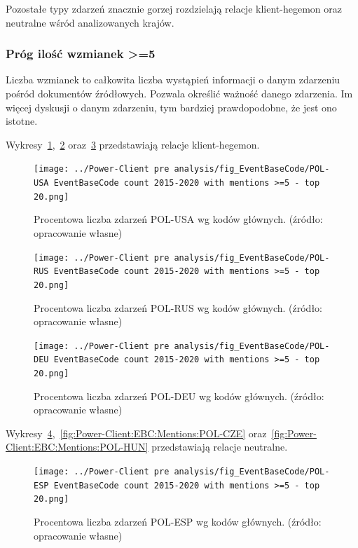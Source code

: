 \documentclass[11pt]{report}
\begin{document}
    Pozostałe typy zdarzeń znacznie gorzej rozdzielają relacje klient-hegemon oraz neutralne wśród analizowanych krajów.

    \subsubsection{Próg ilość wzmianek >=5}
    Liczba wzmianek to całkowita liczba wystąpień informacji o danym zdarzeniu pośród dokumentów źródłowych.
    Pozwala określić ważność danego zdarzenia.
    Im więcej dyskusji o danym zdarzeniu, tym bardziej prawdopodobne, że jest ono istotne.

    Wykresy~\ref{fig:Power-Client:EBC:Mentions:POL-USA},~\ref{fig:Power-Client:EBC:Mentions:POL-RUS} oraz~\ref{fig:Power-Client:EBC:Mentions:POL-DEU} przedstawiają relacje klient-hegemon.
    \begin{figure}[!htp]
        \centering
        \texttt{[image: ../Power-Client pre analysis/fig\_EventBaseCode/POL-USA EventBaseCode count 2015-2020 with mentions >=5 - top 20.png]}
        \caption{Procentowa liczba zdarzeń POL-USA wg kodów głównych. (źródło: opracowanie własne)}
        \label{fig:Power-Client:EBC:Mentions:POL-USA}
    \end{figure}

    \begin{figure}[!htp]
        \centering
        \texttt{[image: ../Power-Client pre analysis/fig\_EventBaseCode/POL-RUS EventBaseCode count 2015-2020 with mentions >=5 - top 20.png]}
        \caption{Procentowa liczba zdarzeń POL-RUS wg kodów głównych. (źródło: opracowanie własne)}
        \label{fig:Power-Client:EBC:Mentions:POL-RUS}
    \end{figure}

    \begin{figure}[!htp]
        \centering
        \texttt{[image: ../Power-Client pre analysis/fig\_EventBaseCode/POL-DEU EventBaseCode count 2015-2020 with mentions >=5 - top 20.png]}
        \caption{Procentowa liczba zdarzeń POL-DEU wg kodów głównych. (źródło: opracowanie własne)}
        \label{fig:Power-Client:EBC:Mentions:POL-DEU}
    \end{figure}

    Wykresy~\ref{fig:Power-Client:EBC:Mentions:POL-ESP},~\ref{fig:Power-Client:EBC:Mentions:POL-CZE} oraz~\ref{fig:Power-Client:EBC:Mentions:POL-HUN} przedstawiają relacje neutralne.
    \begin{figure}[!htp]
        \centering
        \texttt{[image: ../Power-Client pre analysis/fig\_EventBaseCode/POL-ESP EventBaseCode count 2015-2020 with mentions >=5 - top 20.png]}
        \caption{Procentowa liczba zdarzeń POL-ESP wg kodów głównych. (źródło: opracowanie własne)}
        \label{fig:Power-Client:EBC:Mentions:POL-ESP}
    \end{figure}
\end{document}
